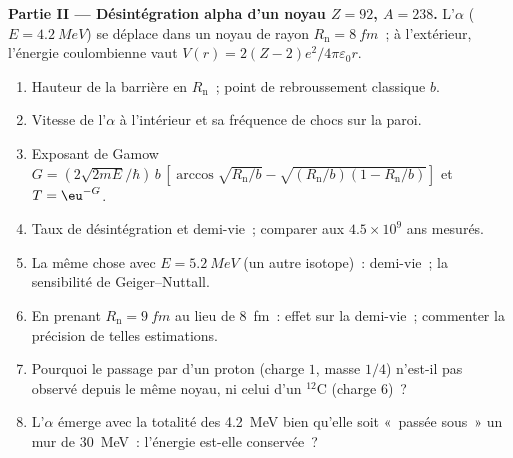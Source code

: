\begin{problem}
\textbf{Partie II --- Désintégration alpha d'un noyau $Z = 92$, $A = 238$.}
L'$\alpha$ ($E = \qty{4.2}{MeV}$) se déplace dans un noyau de rayon
$R_{\text{n}} = \qty{8}{fm}$~; à l'extérieur, l'énergie coulombienne vaut $V(r) =
2(Z - 2)e^2/4\pi\varepsilon_0r$.
\begin{enumerate}[resume]
  \item Hauteur de la barrière en $R_{\text{n}}$~; point de rebroussement classique
        $b$.
  \item Vitesse de l'$\alpha$ à l'intérieur et sa fréquence de chocs sur la
        paroi.
  \item Exposant de Gamow $G = (2\sqrt{2mE}/\hbar)\,b\,[\arccos\sqrt{R_{\text{n}}/b}
        - \sqrt{(R_{\text{n}}/b)(1 - R_{\text{n}}/b)}]$ et $T = \eu^{-G}$.
  \item Taux de désintégration et demi-vie~; comparer aux $4.5 \times
        10^9$ ans mesurés.
  \item La même chose avec $E = \qty{5.2}{MeV}$ (un autre isotope)~: demi-vie~;
        la sensibilité de Geiger--Nuttall.
  \item En prenant $R_{\text{n}} = \qty{9}{fm}$ au lieu de \qty{8}{fm}~: effet sur
        la demi-vie~; commenter la précision de telles estimations.
  \item Pourquoi le passage par  d'un proton (charge $1$, masse $1/4$)
        n'est-il pas observé depuis le même noyau, ni celui d'un $^{12}$C
        (charge $6$)~?
  \item L'$\alpha$ émerge avec la totalité des \qty{4.2}{MeV} bien qu'elle soit
        «~passée sous~» un mur de \qty{30}{MeV}~: l'énergie est-elle conservée~?
\end{enumerate}


\end{problem}
